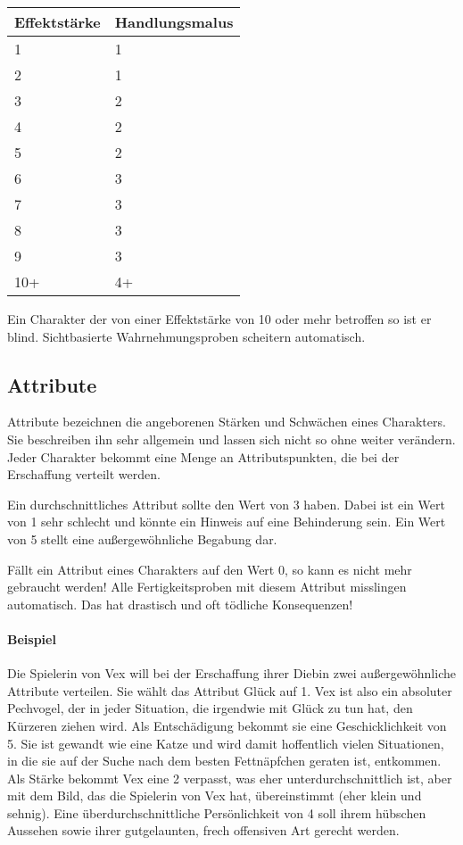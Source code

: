 \documentclass{article}
\begin{document}
\begin{small}
\begin{tabular}{|m{2cm}|m{3cm}|}
\hline
\textbf{Effektstärke}&\textbf{Handlungsmalus}\\
\hline
\hline
1&1\\
\hline
2&1\\
\hline
3&2\\
\hline
4&2\\
\hline
5&2\\
\hline
6&3\\
\hline
7&3\\
\hline
8&3\\
\hline
9&3\\
\hline
10+&4+\\
\hline
\end{tabular}
\end{small}

Ein Charakter der von einer Effektstärke von 10 oder mehr betroffen so ist er blind. Sichtbasierte Wahrnehmungsproben
scheitern automatisch.

\begin{center}
\section{Attribute}
\end{center}

Attribute bezeichnen die angeborenen Stärken und Schwächen eines Charakters. Sie beschreiben ihn sehr allgemein und
lassen sich nicht so ohne weiter verändern. Jeder Charakter bekommt eine Menge an Attributspunkten, die bei der
Erschaffung verteilt werden.

Ein durchschnittliches Attribut sollte den Wert von 3 haben. Dabei ist ein Wert von 1 sehr schlecht und könnte
ein Hinweis auf eine Behinderung sein. Ein Wert von 5 stellt eine außergewöhnliche Begabung dar.

Fällt ein Attribut eines Charakters auf den Wert 0, so kann es nicht mehr gebraucht werden! Alle Fertigkeitsproben
mit diesem Attribut misslingen automatisch. Das hat drastisch und oft tödliche Konsequenzen!

\paragraph{Beispiel}

Die Spielerin von Vex will bei der Erschaffung ihrer Diebin zwei außergewöhnliche Attribute verteilen. Sie wählt das
Attribut Glück auf 1. Vex ist also ein absoluter Pechvogel, der in jeder Situation, die irgendwie mit Glück zu tun hat,
den Kürzeren ziehen wird. Als Entschädigung bekommt sie eine Geschicklichkeit von 5. Sie ist gewandt wie eine Katze und
wird damit hoffentlich vielen Situationen, in die sie auf der Suche nach dem besten Fettnäpfchen geraten ist, entkommen.
Als Stärke bekommt Vex eine 2 verpasst, was eher unterdurchschnittlich ist, aber mit dem Bild, das die Spielerin von Vex
hat, übereinstimmt (eher klein und sehnig). Eine überdurchschnittliche Persönlichkeit von 4 soll ihrem hübschen Aussehen
sowie ihrer gutgelaunten, frech offensiven Art gerecht werden.
\end{document}
